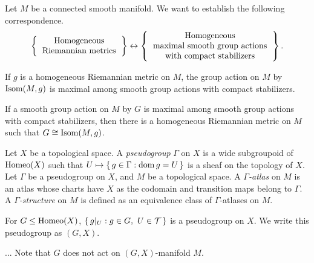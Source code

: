 \documentclass{../note}
\begin{document}
\begin{prb}
Let $M$ be a connected smooth manifold.
We want to establish the following correspondence.
\[\left\{\begin{tabular}{c}Homogeneous\\Riemannian metrics\end{tabular}\right\}\leftrightarrow\left\{\begin{tabular}{c}Homogeneous\\maximal smooth group actions\\with compact stabilizers\end{tabular}\right\}.\]
\begin{parts}
\item If $g$ is a homogeneous Riemannian metric on $M$, the group action on $M$ by $\operatorname{Isom}(M,g)$ is maximal among smooth group actions with compact stabilizers.
\item If a smooth group action on $M$ by $G$ is maximal among smooth group actions with compact stabilizers, then there is a homogeneous Riemannian metric on $M$ such that $G\cong\operatorname{Isom}(M,g)$.
\end{parts}
\end{prb}
\begin{pf}
\end{pf}

\begin{prb}
Let $X$ be a topological space.
A \emph{pseudogroup} $\Gamma$ on $X$ is a wide subgroupoid of $\operatorname{Homeo}(X)$ such that $U\mapsto\{\,g\in\Gamma:\operatorname{dom} g=U\,\}$ is a sheaf on the topology of $X$.
Let $\Gamma$ be a pseudogroup on $X$, and $M$ be a topological space.
A \emph{$\Gamma$-atlas} on $M$ is an atlas whose charts have $X$ as the codomain and transition maps belong to $\Gamma$.
A \emph{$\Gamma$-structure} on $M$ is defined as an equivalence class of $\Gamma$-atlases on $M$.
\begin{parts}
\item For $G\le\operatorname{Homeo}(X)$, $\{\,g|_U:g\in G,\ U\in\mathcal{T}\,\}$ is a pseudogroup on $X$. We write this pseudogroup as $(G,X)$.
\item...
Note that $G$ does not act on $(G,X)$-manifold $M$.
\end{parts}
\end{prb}
\end{document}
